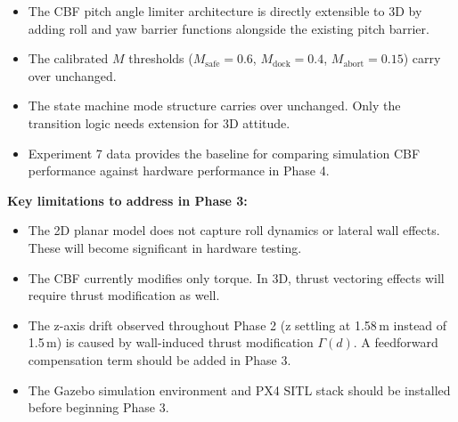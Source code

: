 \documentclass[12pt]{article}
\begin{document}
\begin{itemize}
    \item The CBF pitch angle limiter architecture is directly
          extensible to 3D by adding roll and yaw barrier functions
          alongside the existing pitch barrier.
    \item The calibrated $M$ thresholds
          ($M_\mathrm{safe} = 0.6$, $M_\mathrm{dock} = 0.4$,
          $M_\mathrm{abort} = 0.15$) carry over unchanged.
    \item The state machine mode structure carries over unchanged.
          Only the transition logic needs extension for 3D attitude.
    \item Experiment 7 data provides the baseline for comparing
          simulation CBF performance against hardware performance
          in Phase 4.
\end{itemize}

\textbf{Key limitations to address in Phase 3:}

\begin{itemize}
    \item The 2D planar model does not capture roll dynamics or
          lateral wall effects. These will become significant in
          hardware testing.
    \item The CBF currently modifies only torque. In 3D, thrust
          vectoring effects will require thrust modification as well.
    \item The z-axis drift observed throughout Phase 2 (z settling
          at 1.58\,m instead of 1.5\,m) is caused by wall-induced
          thrust modification $\Gamma(d)$. A feedforward compensation
          term should be added in Phase 3.
    \item The Gazebo simulation environment and PX4 SITL stack should
          be installed before beginning Phase 3.
\end{itemize}
\end{document}

